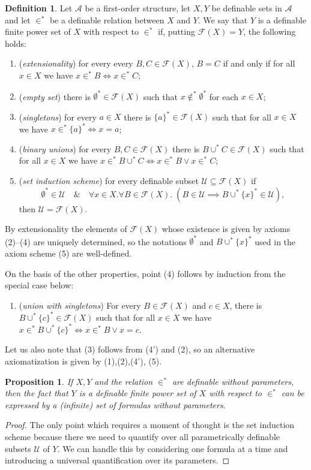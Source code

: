 \documentclass{amsart}
\newcommand{\ca}{\mathcal}
\theoremstyle{plain}
\newtheorem{prop}[thm]{Proposition}
\theoremstyle{definition}
\newtheorem{defn}[thm]{Definition}
\newcommand{\ins}{\in^*}
\newcommand{\F}{\mathcal{F}}
\begin{document}
\begin{defn}\label{defn:hyperfinite}
Let $\ca A$ be a first-order structure, let $X,Y$ be definable sets in $\ca A$ and let $\ins$ be a definable relation between $X$ and $Y$.  We say that $Y$ is a definable finite power set of $X$ with respect to $\ins$ if, putting $\F(X) = Y$,  the following holds:  
\begin{enumerate}
		\item (\emph{extensionality}) for every every $B,C \in \F (X)$, $B=C$ if and only if for all $x\in X$ we have $x\ins B \iff x \ins C$;
		\item (\emph{empty set}) there is $\emptyset^* \in \F (X)$ such that $x \not \ins \emptyset^*$ for each $x \in X$;
		\item (\emph{singletons}) for every $a \in X$ there is $\{a\}^* \in \F (X)$ such that for all $x\in X$ we have $x \ins \{a\}^* \iff x = a$;
		\item (\emph{binary unions}) for every $B,C \in \F (X)$ there is $B \cup^* C \in \F (X)$ such that for all $x\in X$ we have $x \ins B\cup^* C \iff x \ins B \lor x \ins C$;		
		\item (\emph{set induction scheme}) for every definable subset $\ca U \subseteq \F (X)$ if 
		$$\emptyset^* \in \ca U \quad \& \quad \forall x \in X. \forall B\in \F(X). \; (B \in \ca U \implies B \cup^* \{x\}^*\in \ca U),$$ then $\ca U = \F (X)$.
	\end{enumerate}
By extensionality the elements of $\mathcal{F}(X)$ whose existence is given by axioms (2)--(4) are uniquely determined, so the notations $\emptyset^*$ and $B \cup^* \{x\}^*$ used in the axiom scheme (5) are well-defined.
    
On the basis of the other properties, point (4) follows by induction from the special case below: 
\begin{enumerate}
\item[(4')] (\emph{union with singletons}) For every $B\in \F (X)$ and $c\in X$, there is $B \cup^* \{c\}^* \in \F (X)$ such that for all $x\in X$ we have $x \ins B\cup^* \{c\}^* \iff x \ins B \lor x =c $.
\end{enumerate}
Let us also note that (3) follows from (4') and (2), so an alternative axiomatization is given by (1),(2),(4'), (5). 
\end{defn}

\begin{prop}
If $X,Y$ and the relation $\ins$ are definable without parameters, then the fact that $Y$ is a definable finite power set of $X$ with respect to $\ins$ can be expressed by a (infinite) set of formulas without parameters. 
\end{prop}
\begin{proof}
The only point which requires a moment of thought is the set induction scheme because there we need to quantify over all parametrically definable subsets $\ca U$ of $Y$. We can handle this by considering one formula at a time and introducing a universal quantification over its parameters. 
\end{proof}
\end{document}
